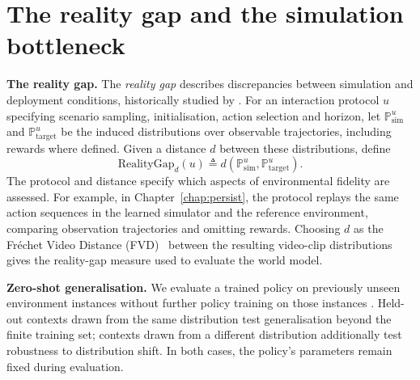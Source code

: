 \section{The reality gap and the simulation bottleneck}
\label{sec:bg_sim2real}
\textbf{The reality gap.} The \textit{reality gap} describes discrepancies between simulation and deployment conditions, historically studied by \citet{jakobi1995noise}. For an interaction protocol $u$ specifying scenario sampling, initialisation, action selection and horizon, let $\mathbb{P}_{\mathrm{sim}}^u$ and $\mathbb{P}_{\mathrm{target}}^u$ be the induced distributions over observable trajectories, including rewards where defined. Given a distance $d$ between these distributions, define
\begin{equation}\label{eq:bg_realitygap}
    \text{RealityGap}_d(u) \triangleq d(\mathbb{P}_{\mathrm{sim}}^u,\mathbb{P}_{\mathrm{target}}^u).
\end{equation}
The protocol and distance specify which aspects of environmental fidelity are assessed. For example, in Chapter~\ref{chap:persist}, the protocol replays the same action sequences in the learned simulator and the reference environment, comparing observation trajectories and omitting rewards. Choosing $d$ as the Fr\'echet Video Distance (FVD)~\citep{unterthiner2018towards} between the resulting video-clip distributions gives the reality-gap measure used to evaluate the world model.

\label{sec:bg_zsg}
\textbf{Zero-shot generalisation.} We evaluate a trained policy on previously unseen environment instances without further policy training on those instances \citep{darla,kirk2023survey}. Held-out contexts drawn from the same distribution test generalisation beyond the finite training set; contexts drawn from a different distribution additionally test robustness to distribution shift. In both cases, the policy's parameters remain fixed during evaluation.


